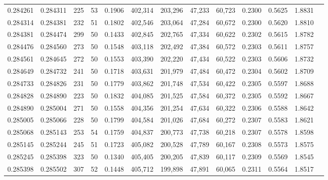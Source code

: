 \begin{tabular}{rrrrrrrrrrrrr}
0.284261 & 0.284311 &   225 &  53 &                                     0.1906 & 402,314 & 203,296 &  47,233 &  60,723 & 0.2300 & 0.5625 & 1.8831 \\
0.284314 & 0.284381 &   232 &  51 &                                     0.1802 & 402,546 & 203,064 &  47,284 &  60,672 & 0.2300 & 0.5620 & 1.8810 \\
0.284381 & 0.284474 &   299 &  50 &                                     0.1433 & 402,845 & 202,765 &  47,334 &  60,622 & 0.2302 & 0.5615 & 1.8782 \\
0.284476 & 0.284560 &   273 &  50 &                                     0.1548 & 403,118 & 202,492 &  47,384 &  60,572 & 0.2303 & 0.5611 & 1.8757 \\
0.284561 & 0.284645 &   272 &  50 &                                     0.1553 & 403,390 & 202,220 &  47,434 &  60,522 & 0.2303 & 0.5606 & 1.8732 \\
0.284649 & 0.284732 &   241 &  50 &                                     0.1718 & 403,631 & 201,979 &  47,484 &  60,472 & 0.2304 & 0.5602 & 1.8709 \\
0.284733 & 0.284826 &   231 &  50 &                                     0.1779 & 403,862 & 201,748 &  47,534 &  60,422 & 0.2305 & 0.5597 & 1.8688 \\
0.284828 & 0.284890 &   223 &  50 &                                     0.1832 & 404,085 & 201,525 &  47,584 &  60,372 & 0.2305 & 0.5592 & 1.8667 \\
0.284890 & 0.285004 &   271 &  50 &                                     0.1558 & 404,356 & 201,254 &  47,634 &  60,322 & 0.2306 & 0.5588 & 1.8642 \\
0.285005 & 0.285066 &   228 &  50 &                                     0.1799 & 404,584 & 201,026 &  47,684 &  60,272 & 0.2307 & 0.5583 & 1.8621 \\
0.285068 & 0.285143 &   253 &  54 &                                     0.1759 & 404,837 & 200,773 &  47,738 &  60,218 & 0.2307 & 0.5578 & 1.8598 \\
0.285145 & 0.285244 &   245 &  51 &                                     0.1723 & 405,082 & 200,528 &  47,789 &  60,167 & 0.2308 & 0.5573 & 1.8575 \\
0.285245 & 0.285398 &   323 &  50 &                                     0.1340 & 405,405 & 200,205 &  47,839 &  60,117 & 0.2309 & 0.5569 & 1.8545 \\
0.285398 & 0.285502 &   307 &  52 &                                     0.1448 & 405,712 & 199,898 &  47,891 &  60,065 & 0.2311 & 0.5564 & 1.8517 \\

\end{tabular}
